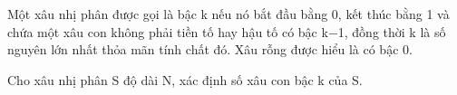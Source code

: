 Một xâu nhị phân được gọi là bậc k nếu nó bắt đầu bằng 0, kết thúc bằng 1 và chứa một xâu con không phải tiền tố hay hậu tố có bậc k−1, đồng thời k là số nguyên lớn nhất thỏa mãn tính chất đó. Xâu rỗng được hiểu là có bậc 0.  

   Cho xâu nhị phân S độ dài N, xác định số xâu con bậc k của S.